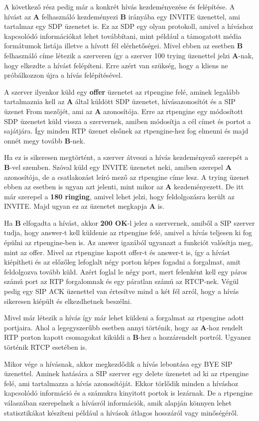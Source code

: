 A következő rész pedig már a konkrét hívás kezdeményezése és felépítése. A hívást az 
\textbf{A} felhasználó kezdeményezi \textbf{B} irányába egy INVITE üzenettel, ami tartalmaz
egy SDP üzenetet is. Ez az SDP egy olyan protokoll, amivel a híváshoz kapcsolódó információkat
lehet továbbítani, mint például a támogatott média formátumok listája illetve a hívott fél
elérhetőségei. Mivel ebben az esetben \textbf{B} felhasználó címe létezik a szerveren így
a szerver 100 trying üzenettel jelzi \textbf{A}-nak, hogy elkezdte a hívást felépíteni. Erre
azért van szükség, hogy a kliens ne próbálkozzon újra a hívás felépítésével.

A szerver ilyenkor küld egy \textbf{offer} üzenetet az rtpengine felé, aminek legalább 
tartalmaznia kell az \textbf{A} által küldött SDP üzenetet, hívásazonosítót és a SIP üzenet
From mezőjét, ami az \textbf{A} azonosítója. Erre az rtpengine egy módosított SDP üzenetet küld
vissza a szervernek, amiben módosítja a cél címet és portot a sajátjára. Így minden RTP
üzenet elsőnek az rtpengine-hez fog elmenni és majd onnét megy tovább \textbf{B}-nek.

Ha ez is sikeresen megtörtént, a szerver átveszi a hívás kezdeményező szerepét a \textbf{B}-vel
szemben. Szóval küld egy INVITE üzenetet neki, amiben szerepel \textbf{A} azonosítója, de
a csatlakozást leíró mező az rtpengine címe lesz. A trying üzenet ebben az esetben is 
ugyan azt jelenti, mint mikor az \textbf{A} kezdeményezett. De itt már szerepel a 
\textbf{180 ringing}, amivel lehet jelzi, hogy feldolgozásra került az INVITE. Majd ugyan ez 
az üzenetet megkapja \textbf{A} is. 

Ha \textbf{B} elfogadta a hívást, akkor \textbf{200 OK}-l jelez a szervernek, amiből a
SIP szerver tudja, hogy answer-t kell küldenie az rtpengine felé, amivel a hívás teljesen
ki fog épülni az rtpengine-ben is. Az answer igazából ugyanazt a funkciót valósítja meg,
mint az offer. Mivel az rtpengine kapott offer-t és answer-t is, így a hívást kiépítheti
és az előzőleg lefoglalt négy porton képes fogadni a forgalmat, amit feldolgozva 
tovább küld. Azért foglal le négy port, mert felenként kell egy páros számú port az 
RTP forgalomnak és egy páratlan számú az RTCP-nek. Végül pedig egy SIP ACK üzenettel van
értesítve mind a két fél arról, hogy a hívás sikeresen kiépült és elkezdhetnek 
beszélni. 

Mivel már létezik a hívás így már lehet küldeni a forgalmat az rtpengine adott 
portjaira. Ahol a legegyszerűbb esetben annyi történik, hogy az \textbf{A}-hoz rendelt
RTP porton kapott csomagokat kiküldi a \textbf{B}-hez a hozzárendelt portról. Ugyanez
történik RTCP esetében is. 

Mikor vége a hívásnak, akkor megkezdődik a hívás lebontása egy BYE SIP üzenettel. Aminek
hatására a SIP szerver egy delete üzenetet ad ki az rtpengine felé, ami tartalmazza a hívás
azonosítóját. Ekkor törlődik minden a híváshoz kapcsolódó információ és a számukra kinyitott
portok is lezárnak. De a rtpengine válaszában szerepelnek a hívásról információk, amik alapján
könnyen lehet statisztikákat készíteni például a hívások átlagos hosszáról vagy minőségéről.